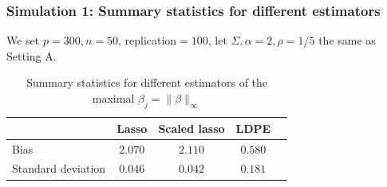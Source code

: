 \begin{frame}
\frametitle{Simulation 1: Summary statistics for different estimators}
We set $p=300, n=50$, replication$=100$, let $\Sigma, \alpha=2, \rho=1/5$ the same as Setting A. %

\begin{table}[ht]
\caption{Summary statistics for different estimators of the maximal $\beta_j = \| \beta \|_{\infty}$}
\begin{tabular}{lcccc}
\toprule
&Lasso&Scaled lasso&LDPE \\
\midrule
Bias & $2.070$ & $2.110$ & $0.580$ \\
Standard deviation & $0.046$ & $0.042$ & $0.181$ \\
\bottomrule
\end{tabular}
\label{liu1}

\end{table}
\end{frame}


